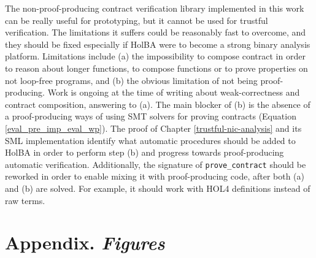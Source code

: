 \documentclass[10pt,a4paper]{article}
\begin{document}
\begin{multicols}{2}
The non-proof-producing contract verification library implemented in this work can be really useful for prototyping, but it cannot be used for trustful verification. The limitations it suffers could be reasonably fast to overcome, and they should be fixed especially if HolBA were to become a strong binary analysis platform. Limitations include (a) the impossibility to compose contract in order to reason about longer functions, to compose functions or to prove properties on not loop-free programs, and (b) the obvious limitation of not being proof-producing. Work is ongoing at the time of writing about weak-correctness and contract composition, answering to (a). The main blocker of (b) is the absence of a proof-producing ways of using SMT solvers for proving contracts (Equation \ref{eval_pre_imp_eval_wp}). The proof of Chapter \ref{trustful-nic-analysis} and its SML implementation identify what automatic procedures should be added to HolBA in order to perform step (b) and progress towards proof-producing automatic verification. Additionally, the signature of \texttt{prove\_contract} should be reworked in order to enable mixing it with proof-producing code, after both (a) and (b) are solved. For example, it should work with HOL4 definitions instead of raw terms.








































\end{multicols}

\renewcommand*{\bibfont}{\footnotesize}
\printbibliography

\newpage
\section*{Appendix. {\normalsize\textit{Figures}}}
\renewcommand{\thefigure}{A.\arabic{figure}}
\setcounter{figure}{0}
\end{document}
